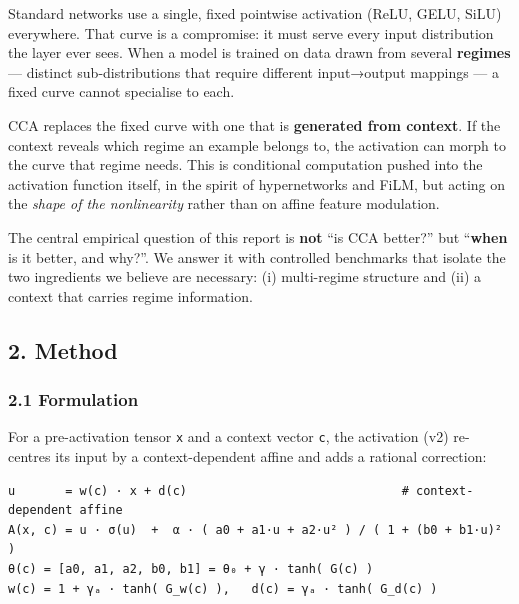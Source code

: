 \documentclass[
  11pt,
]{article}
\begin{document}
Standard networks use a single, fixed pointwise activation (ReLU, GELU,
SiLU) everywhere. That curve is a compromise: it must serve every input
distribution the layer ever sees. When a model is trained on data drawn
from several \textbf{regimes} --- distinct sub-distributions that
require different input→output mappings --- a fixed curve cannot
specialise to each.

CCA replaces the fixed curve with one that is \textbf{generated from
context}. If the context reveals which regime an example belongs to, the
activation can morph to the curve that regime needs. This is conditional
computation pushed into the activation function itself, in the spirit of
hypernetworks and FiLM, but acting on the \emph{shape of the
nonlinearity} rather than on affine feature modulation.

The central empirical question of this report is \textbf{not} ``is CCA
better?'' but ``\textbf{when} is it better, and why?''. We answer it
with controlled benchmarks that isolate the two ingredients we believe
are necessary: (i) multi-regime structure and (ii) a context that
carries regime information.

\subsection{2. Method}\label{method}

\subsubsection{2.1 Formulation}\label{formulation}

For a pre-activation tensor \texttt{x} and a context vector \texttt{c},
the activation (v2) re-centres its input by a context-dependent affine
and adds a rational correction:

\begin{verbatim}
u       = w(c) · x + d(c)                              # context-dependent affine
A(x, c) = u · σ(u)  +  α · ( a0 + a1·u + a2·u² ) / ( 1 + (b0 + b1·u)² )
θ(c) = [a0, a1, a2, b0, b1] = θ₀ + γ · tanh( G(c) )
w(c) = 1 + γₐ · tanh( G_w(c) ),   d(c) = γₐ · tanh( G_d(c) )
\end{verbatim}
\end{document}
